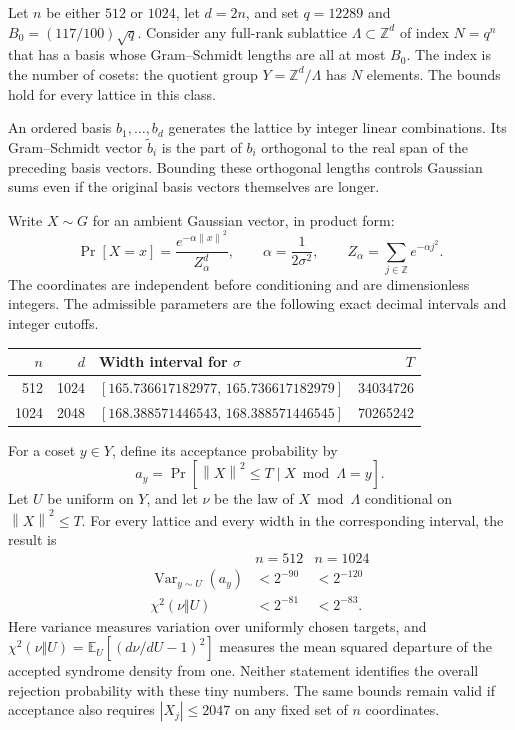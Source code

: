 \documentclass[11pt,a4paper]{article}
\newcommand{\Z}{\mathbb Z}
\newcommand{\E}{\mathbb E}
\newcommand{\norm}[1]{\left\lVert#1\right\rVert}
\theoremstyle{definition}
\theoremstyle{remark}
\numberwithin{equation}{section}
\begin{document}
Let $n$ be either $512$ or $1024$, let $d=2n$, and set
$q=12289$ and $B_0=(117/100)\sqrt q$. Consider any full-rank sublattice
$\Lambda\subset\Z^d$ of index $N=q^n$ that has a basis whose
Gram--Schmidt lengths are all at most $B_0$. The index is the number of
cosets: the quotient group $Y=\Z^d/\Lambda$ has $N$ elements. The bounds
hold for every lattice in this class.

An ordered basis $b_1,\ldots,b_d$ generates the lattice by integer linear combinations. Its Gram--Schmidt vector $\widetilde b_i$ is the part of $b_i$ orthogonal to the real span of the preceding basis vectors. Bounding these orthogonal lengths controls Gaussian sums even if the original basis vectors themselves are longer.

Write $X\sim G$ for an ambient Gaussian vector, in product form:
\begin{equation}
 \Pr[X=x]=\frac{e^{-\alpha\norm{x}^2}}{Z_\alpha^d},
 \qquad \alpha=\frac1{2\sigma^2},\qquad
 Z_\alpha=\sum_{j\in\Z}e^{-\alpha j^2}.
 \label{eq:norm-gaussian}
\end{equation}
The coordinates are independent before conditioning and are dimensionless
integers. The admissible parameters
are the following exact decimal intervals and integer cutoffs.

\begin{center}
\small
\begin{tabular}{@{}r r l r@{}}
\toprule
$n$ & $d$ & Width interval for $\sigma$ & $T$\\
\midrule
512 & 1024 & $[165.736617182977,\,165.736617182979]$ & 34034726\\
1024 & 2048 & $[168.388571446543,\,168.388571446545]$ & 70265242\\
\bottomrule
\end{tabular}
\end{center}

For a coset $y\in Y$, define its acceptance probability by
\[
 a_y=\Pr[\norm X^2\le T\mid X\bmod\Lambda=y].
\]
Let $U$ be uniform on $Y$, and let $\nu$ be the law of
$X\bmod\Lambda$ conditional on $\norm X^2\le T$. For every lattice and
every width in the corresponding interval, the result is
\begin{equation}
\begin{array}{c|cc}
 & n=512 & n=1024\\\hline
\operatorname{Var}_{y\sim U}(a_y)&<2^{-90}&<2^{-120}\\
\chi^2(\nu\Vert U)&<2^{-81}&<2^{-83}.
\end{array}
\label{eq:norm-main}
\end{equation}
Here variance measures variation over uniformly chosen targets, and
$\chi^2(\nu\Vert U)=\E_U[(d\nu/dU-1)^2]$ measures the mean squared
departure of the accepted syndrome density from one. Neither statement
identifies the overall rejection probability with these tiny numbers.
The same bounds remain valid if acceptance also requires
$|X_j|\le2047$ on any fixed set of $n$ coordinates.
\end{document}
